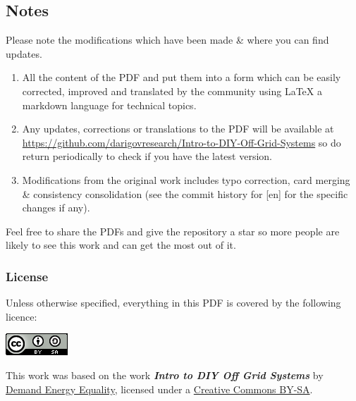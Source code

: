 \documentclass{article}
\theoremstyle{definition}
\theoremstyle{definition}
\theoremstyle{remark}
\begin{document}

  \subsection*{Notes} %
  \label{sub:notes}

    Please note the modifications which have been made \& where you can find updates.

    \begin{enumerate}
      \item All the content of the PDF and put them into a form which can be easily corrected, improved and translated by the community using LaTeX a markdown language for technical topics.
      \item Any updates, corrections or translations to the PDF will be available at \href{https://github.com/darigovresearch/Intro-to-DIY-Off-Grid-Systems}{https://github.com/darigovresearch/Intro-to-DIY-Off-Grid-Systems} so do return periodically to check if you have the latest version.
      \item Modifications from the original work includes typo correction, card merging \& consistency consolidation (see the commit history for [en] for the specific changes if any).
    \end{enumerate}

    Feel free to share the PDFs and give the repository a star so more people are likely to see this work and can get the most out of it.


  \subsubsection*{License} %
  \label{ssub:license}

    Unless otherwise specified, everything in this PDF is covered by the following licence:

    \includegraphics[]{../Images/image_0_2_(license).png} \newline

    This work was based on the work \textbf{\textit{Intro to DIY Off Grid Systems}} by \href{https://www.demandenergyequality.org/}{Demand Energy Equality}, licensed under a \href{https://creativecommons.org/licenses/by-sa/4.0/legalcode}{Creative Commons BY-SA}.
\end{document}
